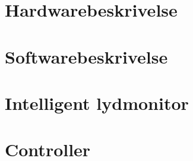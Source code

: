 

\newpage
\section{Hardwarebeskrivelse}


\clearpage
\section{Softwarebeskrivelse}


\clearpage
\section{Intelligent lydmonitor}



\clearpage
\section{Controller}



